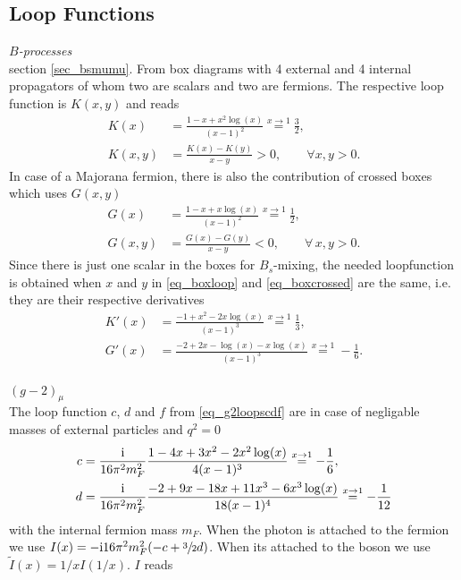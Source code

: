 \begin{appendix}
 \section{Loop Functions}
\label{sec_appendix}
\textit{$B$-processes}\\
\noindent section \ref{sec_bsmumu}. From box diagrams with 4 external and 4 internal propagators of whom two are scalars and two are fermions.
The respective loop function is $K(x,y)$ and reads \cite{Grip}
\begin{align}
 K(x)&=\frac{1-x+x^2\log(x)}{(x-1)^2} \stackrel{x\rightarrow 1}{=} \frac32, \\
 K(x,y) &= \frac{K(x)-K(y)}{x-y} > 0, \qquad\forall x,y > 0.
 \label{eq_boxloop}
\end{align}
In case of a Majorana fermion, there is also the contribution of crossed boxes which uses $G(x,y)$
\begin{align}
 G(x)&=\frac{1-x+x\log(x)}{(x-1)^2} \stackrel{x\rightarrow 1}{=} \frac12,\\
 G(x,y) &= \frac{G(x)-G(y)}{x-y} < 0,\qquad \forall\, x,y>0.
 \label{eq_boxcrossed}
\end{align}
Since there is just one scalar in the boxes for $B_s$-mixing, the needed loopfunction is obtained when $x$ and $y$ in \eqref{eq_boxloop} and 
\eqref{eq_boxcrossed} are the same, i.e. they are their respective derivatives
\begin{align}
 K'(x)&=\frac{-1+x^2-2x\log(x)}{(x-1)^3} \stackrel{x\rightarrow 1}{=} \frac13,\\
 G'(x)&=\frac{-2+2x-\log(x)-x\log(x)}{(x-1)^3} \stackrel{x\rightarrow 1}{=} -\frac16.
 \label{eq_mixloops}
\end{align}
\\ $(g-2)_\mu$\\
\noindent 
The loop function $c$, $d$ and $f$ from \eqref{eq_g2loopscdf} are in case of negligable masses of external particles and $q^2=0$ \cite{Lavoura}
\begin{align}
 c &= \frac{\text{i}}{16\pi^2m_F^2} \frac{1-4x+3x^2-2x^2\log(x)}{4(x-1)^3}\stackrel{x\rightarrow 1}{=} -\frac16,\\
 d &= \frac{\text{i}}{16\pi^2m_F^2} \frac{-2+9x-18x+11x^3 - 6x^3\log(x)}{18(x-1)^4} \stackrel{x\rightarrow 1}{=} -\frac{1}{12}
 \label{eq_loopscd}
\end{align}
with the internal fermion mass $m_F$. When the photon is attached to the fermion we use $I(x) = -\text{i} 16\pi^2m^2_F(-c+\sfrac32 d)$. 
When its attached to the boson we use $\tilde{I}(x)=1/xI(1/x)$. $I$ reads

\end{appendix}
